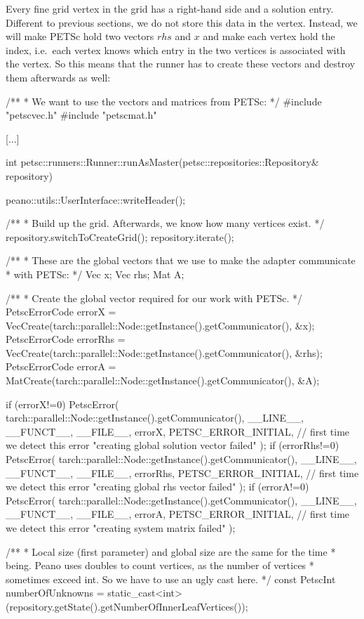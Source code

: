 Every fine grid vertex in the grid has a right-hand side and a solution entry. 
Different to previous sections, we do not store this data in the vertex.
Instead, we will make PETSc hold two vectors $rhs$ and $x$ and
make each vertex hold the index, i.e.~each vertex knows which entry in the two
vertices is associated with the vertex.
So this means that the runner has to create these vectors and destroy them
afterwards as well:

\begin{code}
/**
 * We want to use the vectors and matrices from PETSc:
 */
#include "petscvec.h"
#include "petscmat.h"

[...]

int petsc::runners::Runner::runAsMaster(petsc::repositories::Repository& repository) {
  peano::utils::UserInterface::writeHeader();


  /**
   * Build up the grid. Afterwards, we know how many vertices exist.
   */
  repository.switchToCreateGrid(); repository.iterate();


  /**
   * These are the global vectors that we use to make the adapter communicate
   * with PETSc:
   */
  Vec  x;
  Vec  rhs;
  Mat  A;

  /**
   * Create the global vector required for our work with PETSc.
   */
  PetscErrorCode errorX   = VecCreate(tarch::parallel::Node::getInstance().getCommunicator(), &x);
  PetscErrorCode errorRhs = VecCreate(tarch::parallel::Node::getInstance().getCommunicator(), &rhs);
  PetscErrorCode errorA   = MatCreate(tarch::parallel::Node::getInstance().getCommunicator(), &A);

  if (errorX!=0) {
    PetscError( tarch::parallel::Node::getInstance().getCommunicator(),
      __LINE__,  __FUNCT__,  __FILE__, errorX,  PETSC_ERROR_INITIAL, // first time we detect this error
      "creating global solution vector failed" );
  }
  if (errorRhs!=0) {
    PetscError( tarch::parallel::Node::getInstance().getCommunicator(),
      __LINE__,  __FUNCT__,  __FILE__, errorRhs,  PETSC_ERROR_INITIAL, // first time we detect this error
      "creating global rhs vector failed" );
  }
  if (errorA!=0) {
    PetscError( tarch::parallel::Node::getInstance().getCommunicator(),
      __LINE__,  __FUNCT__,  __FILE__, errorA,  PETSC_ERROR_INITIAL, // first time we detect this error
      "creating system matrix failed" );
  }


  /**
   * Local size (first parameter) and global size are the same for the time
   * being. Peano uses doubles to count vertices, as the number of vertices
   * sometimes exceed int. So we have to use an ugly cast here.
   */
  const PetscInt numberOfUnknowns = static_cast<int>(repository.getState().getNumberOfInnerLeafVertices());

}
\end{code}
